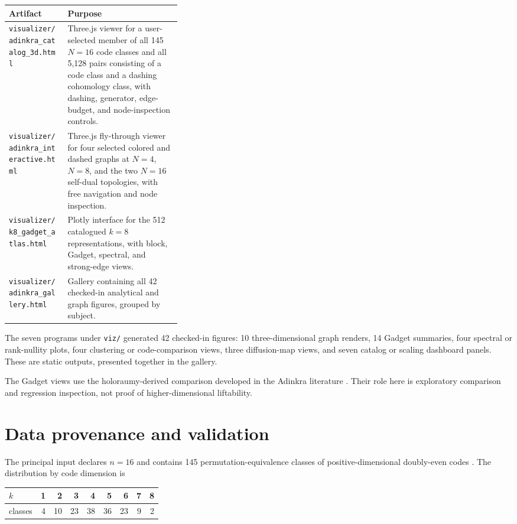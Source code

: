 \documentclass[11pt]{article}
\newcommand{\pathcode}[1]{\nolinkurl{#1}}
\newcommand{\artifactpath}[1]{{\scriptsize\pathcode{#1}}}
\begin{document}
\begin{tabularx}{\linewidth}{@{}p{0.34\linewidth}X@{}}
\toprule
Artifact & Purpose \\
\midrule
\artifactpath{visualizer/adinkra_catalog_3d.html} & Three.js viewer for a
user-selected member of
all 145 $N=16$ code classes and all 5,128 pairs consisting of a code class and a
dashing cohomology class,
with dashing, generator, edge-budget, and node-inspection controls. \\
\artifactpath{visualizer/adinkra_interactive.html} & Three.js fly-through viewer
for four selected colored and dashed graphs at $N=4$, $N=8$, and the two
$N=16$ self-dual topologies, with free navigation and node inspection. \\
\artifactpath{visualizer/k8_gadget_atlas.html} & Plotly interface for
the 512 catalogued $k=8$ representations, with block, Gadget, spectral, and
strong-edge views. \\
\artifactpath{visualizer/adinkra_gallery.html} & Gallery containing all 42
checked-in analytical and graph figures, grouped by subject. \\
\bottomrule
\end{tabularx}

The seven programs under \pathcode{viz/} generated 42 checked-in figures: 10
three-dimensional graph renders, 14 Gadget summaries, four spectral or
rank-nullity plots, four clustering or code-comparison views, three diffusion-map
views, and seven catalog or scaling dashboard panels.  These are static outputs,
presented together in the gallery.

The Gadget views use the holoraumy-derived comparison developed in the Adinkra
literature \cite{gates2015gadget}.  Their role here is exploratory comparison
and regression inspection, not proof of higher-dimensional liftability.

\section{Data provenance and validation}

The principal input declares $n=16$ and contains 145 permutation-equivalence
classes of positive-dimensional doubly-even codes \cite{doran2008topology}.  The distribution by code
dimension is

\begin{center}
\begin{tabular}{@{}lrrrrrrrr@{}}
\toprule
$k$ & 1 & 2 & 3 & 4 & 5 & 6 & 7 & 8 \\
\midrule
classes & 4 & 10 & 23 & 38 & 36 & 23 & 9 & 2 \\
\bottomrule
\end{tabular}
\end{center}
\end{document}
